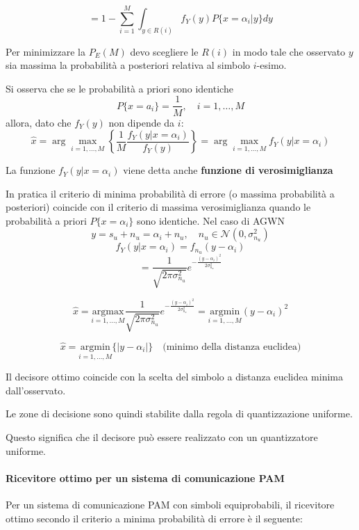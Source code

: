 \[
= 1 - \sum_{i=1}^M \int_{y \in R(i)} f_Y(y) P\{x = \alpha_i | y\} dy
\]

Per minimizzare la $P_E(M)$ devo scegliere le $R(i)$ in modo tale che osservato $y$ sia massima la probabilità a posteriori relativa al simbolo $i$-esimo.

Si osserva che se le probabilità a priori sono identiche
\[
P\{x = a_i\} = \frac{1}{M}, \quad i=1,\ldots,M
\]
allora, dato che $f_Y(y)$ non dipende da $i$:
\[
\hat{x} = \arg \max_{i=1,\ldots,M} \left\{ \frac{1}{M} \frac{f_Y(y | x = \alpha_i)}{f_Y(y)} \right\} = \arg \max_{i=1,\ldots,M} f_Y(y | x = \alpha_i) 
\]


La funzione $f_Y(y|x=\alpha_i)$ viene detta anche \textbf{funzione di verosimiglianza}

In pratica il criterio di minima probabilità di errore (o massima probabilità a posteriori) coincide con il criterio di massima verosimiglianza quando le probabilità a priori $P\{x=\alpha_i\}$ sono identiche.
Nel caso di AGWN
\[
y = s_u + n_u = \alpha_i + n_u, \quad n_u \in \mathcal{N}(0,\sigma_{n_u}^2)
\]
\[
f_Y(y|x = \alpha_i) = f_{n_u}(y - \alpha_i)
\]
\[
= \frac{1}{\sqrt{2\pi\sigma_{n_u}^2}} e^{-\frac{(y-\alpha_i)^2}{2\sigma_{n_u}^2}}
\]

\[
\hat{x} = \underset{i=1,\ldots,M}{\mathrm{argmax}} \frac{1}{\sqrt{2\pi\sigma_{n_u}^2}} e^{-\frac{(y-\alpha_i)^2}{2\sigma_{n_u}^2}} = \underset{i=1,\ldots,M}{\mathrm{argmin}}  (y - \alpha_i)^2 
\]

\[
\boxed{
  \hat{x} = \underset{i=1,\ldots,M}{\mathrm{argmin}} \{ |y-\alpha_i| \}
} \quad \text{(minimo della distanza euclidea)}
\]


Il decisore ottimo coincide con la scelta del simbolo a distanza euclidea minima dall'osservato.

Le zone di decisione sono quindi stabilite dalla regola di quantizzazione uniforme.

Questo significa che il decisore può essere realizzato con un quantizzatore uniforme.


\paragraph{Ricevitore ottimo per un sistema di comunicazione PAM}

Per un sistema di comunicazione PAM con simboli equiprobabili, il ricevitore ottimo secondo il criterio a minima probabilità di errore è il seguente:

